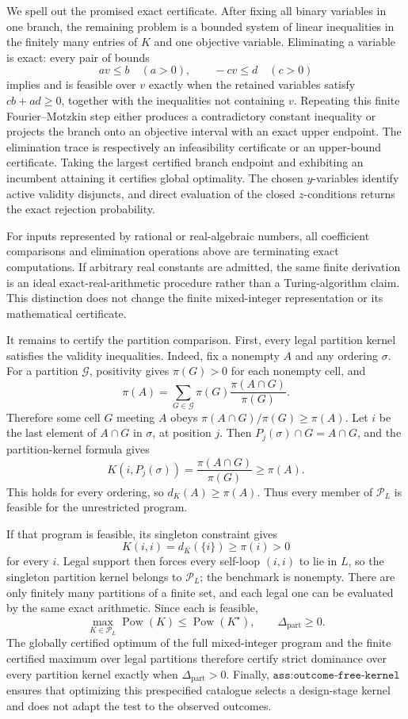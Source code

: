We spell out the promised exact certificate.  After fixing all binary variables in one branch, the remaining problem is a bounded system of linear inequalities in the finitely many entries of \(K\) and one objective variable.  Eliminating a variable is exact: every pair of bounds
\[
 a v\leq b\quad(a>0),
 \qquad
 -c v\leq d\quad(c>0)
\]
implies and is feasible over \(v\) exactly when the retained variables satisfy \(cb+ad\geq0\), together with the inequalities not containing \(v\).  Repeating this finite Fourier--Motzkin step either produces a contradictory constant inequality or projects the branch onto an objective interval with an exact upper endpoint.  The elimination trace is respectively an infeasibility certificate or an upper-bound certificate.  Taking the largest certified branch endpoint and exhibiting an incumbent attaining it certifies global optimality.  The chosen \(y\)-variables identify active validity disjuncts, and direct evaluation of the closed \(z\)-conditions returns the exact rejection probability.

For inputs represented by rational or real-algebraic numbers, all coefficient comparisons and elimination operations above are terminating exact computations.  If arbitrary real constants are admitted, the same finite derivation is an ideal exact-real-arithmetic procedure rather than a Turing-algorithm claim.  This distinction does not change the finite mixed-integer representation or its mathematical certificate.

It remains to certify the partition comparison.  First, every legal partition kernel satisfies the validity inequalities.  Indeed, fix a nonempty \(A\) and any ordering \(\sigma\).  For a partition \(\mathcal G\), positivity gives \(\pi(G)>0\) for each nonempty cell, and
\[
 \pi(A)=\sum_{G\in\mathcal G}\pi(G)\frac{\pi(A\cap G)}{\pi(G)}.
\]
Therefore some cell \(G\) meeting \(A\) obeys \(\pi(A\cap G)/\pi(G)\geq\pi(A)\).  Let \(i\) be the last element of \(A\cap G\) in \(\sigma\), at position \(j\).  Then \(P_j(\sigma)\cap G=A\cap G\), and the partition-kernel formula gives
\[
 K(i,P_j(\sigma))=\frac{\pi(A\cap G)}{\pi(G)}\geq\pi(A).
\]
This holds for every ordering, so \(d_K(A)\geq\pi(A)\).  Thus every member of \(\mathcal P_L\) is feasible for the unrestricted program.

If that program is feasible, its singleton constraint gives
\[
 K(i,i)=d_K(\{i\})\geq\pi(i)>0
\]
for every \(i\).  Legal support then forces every self-loop \((i,i)\) to lie in \(L\), so the singleton partition kernel belongs to \(\mathcal P_L\); the benchmark is nonempty.  There are only finitely many partitions of a finite set, and each legal one can be evaluated by the same exact arithmetic.  Since each is feasible,
\[
 \max_{K\in\mathcal P_L}\operatorname{Pow}(K)
 \leq \operatorname{Pow}(K^\star),
 \qquad
 \Delta_{\mathrm{part}}\geq0.
\]
The globally certified optimum of the full mixed-integer program and the finite certified maximum over legal partitions therefore certify strict dominance over every partition kernel exactly when \(\Delta_{\mathrm{part}}>0\).  Finally, \(\texttt{ass:outcome-free-kernel}\) ensures that optimizing this prespecified catalogue selects a design-stage kernel and does not adapt the test to the observed outcomes.


